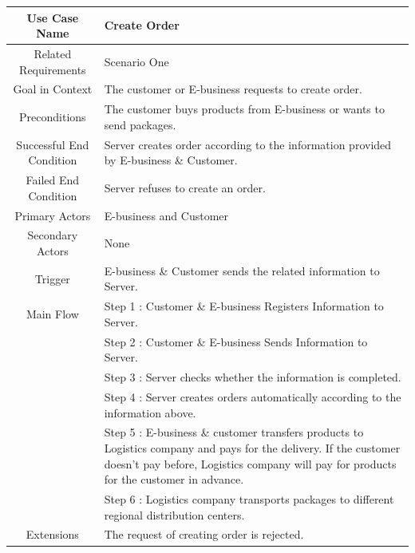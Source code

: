 \documentclass[12pt]{scrreprt}
\begin{document}
\begin{table}
  \centering
  \begin{tabular}{| c | p{11cm} |}
    \hline
    Use Case Name & Create Order\\
    \hline
    Related Requirements & Scenario One\\
    \hline
    Goal in Context & The customer or E-business requests to create order.\\
    \hline
    Preconditions & The customer buys products from E-business or wants to
    send packages.\\
    \hline
    Successful End Condition & Server creates order according to the
    information provided by E-business \& Customer.\\
    \hline
    Failed End Condition & Server refuses to create an order.\\
    \hline
    Primary Actors & E-business and Customer\\
    \hline
    Secondary Actors & None\\
    \hline
    Trigger & E-business \& Customer sends the related information to Server.\\
    \hline
    Main Flow & Step 1 : Customer \& E-business Registers Information to Server.\\
    & Step 2 : Customer \& E-business Sends Information to Server.\\
    & Step 3 : Server checks whether the information is completed.\\
    & Step 4 : Server creates orders automatically according to the information above.\\
    & Step 5 : E-business \& customer transfers products to Logistics
    company and pays for the delivery. If the customer doesn’t pay before,
    Logistics company will pay for products for the customer in advance.\\
    & Step 6 : Logistics company transports packages to different regional
    distribution centers.\\
    \hline
    Extensions & The request of creating order is rejected.\\
    \hline
  \end{tabular}
\end{table}
\end{document}

